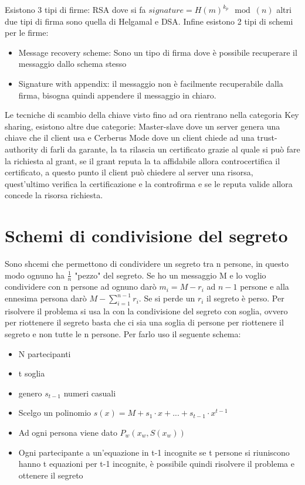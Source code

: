 \documentclass[10pt,a4paper]{article}
\begin{document}
Esistono 3 tipi di firme: RSA dove si fa $signature = H(m)^{k_p} \mod(n)$ altri due tipi di firma sono quella di Helgamal e DSA. Infine esistono 2 tipi di schemi per le firme:
\begin{itemize}
\item Message recovery scheme: Sono un tipo di firma dove è possibile recuperare il messaggio dallo schema stesso
\item Signature with appendix: il messaggio non è facilmente recuperabile dalla firma, bisogna quindi appendere il messaggio in chiaro.
\end{itemize}

Le tecniche di scambio della chiave visto fino ad ora rientrano nella categoria Key sharing, esistono altre due categorie: Master-slave dove un server genera una chiave che il client usa e Cerberus Mode dove un client chiede ad una trust-authority di farli da garante, la ta rilascia un certificato grazie al quale si può fare la richiesta al grant, se il grant reputa la ta affidabile allora controcertifica il certificato, a questo punto il client può chiedere al server una risorsa, quest'ultimo verifica la certificazione e la controfirma e se le reputa valide allora concede la risorsa richiesta.

\section{Schemi di condivisione del segreto}
Sono shcemi che permettono di condividere un segreto tra n persone, in questo modo ognuno ha $\frac{1}{n}$ "pezzo" del segreto. Se ho un messaggio M e lo voglio condividere con n persone ad ognuno darò $m_i=M-r_i$ ad $n-1$ persone e alla ennesima persona darò $M- \sum_{i=1}^{n-1} r_i$. Se si perde un $r_i$ il segreto è perso. Per risolvere il problema si usa la con la condivisione del segreto con soglia, ovvero per riottenere il segreto basta che ci sia una soglia di persone per riottenere il segreto e non tutte le n persone. Per farlo uso il seguente schema:
\begin{itemize}
\item N partecipanti
\item t soglia
\item genero $s_{t-1}$ numeri casuali
\item Scelgo un polinomio $s(x)=M+s_1\cdot x+...+s_{t-1}\cdot x^{t-1}$
\item Ad ogni persona viene dato $P_w(x_w,S(x_w))$ 
\item Ogni partecipante a un'equazione in t-1 incognite se t persone si riuniscono hanno t equazioni per t-1 incognite, è possibile quindi risolvere il problema e ottenere il segreto
\end{itemize}
\end{document}
